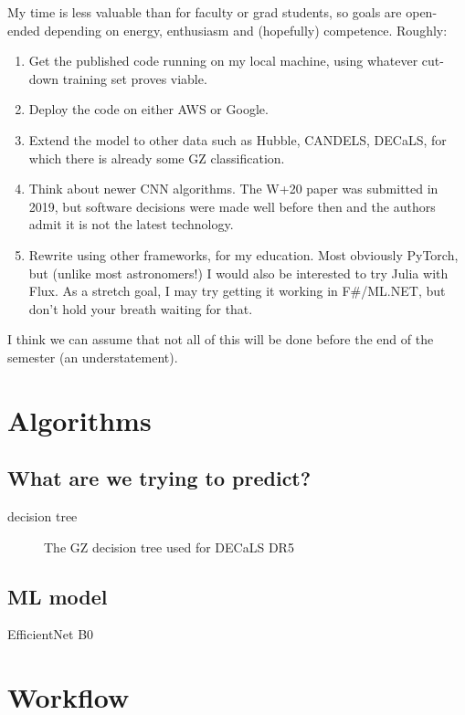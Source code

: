 \documentclass[twocolumn, twocolappendix, tighten]{aastex631}
\begin{document}
My time is less valuable than for faculty or grad students, so goals are open-ended depending on energy, enthusiasm and (hopefully) competence. Roughly:
\begin{enumerate}
	\item Get the published code running on my local machine, using whatever cut-down training set proves viable.
	\item Deploy the code on either AWS or Google.
	\item Extend the model to other data such as Hubble, CANDELS, DECaLS, for which there is already some GZ classification.
	\item Think about newer CNN algorithms. The W+20 paper was submitted in 2019, but software decisions were made well before then and the authors admit it is not the latest technology.
	\item Rewrite using other frameworks, for my education. Most obviously PyTorch, but (unlike most astronomers!) I would also be interested to try Julia with Flux. As a stretch goal, I may try getting it working in F\#/ML.NET, but don't hold your breath waiting for that.
\end{enumerate}

I think we can assume that not all of this will be done before the end of the semester (an understatement).

\section{Algorithms}

\subsection{What are we trying to predict?}

decision tree

\begin{figure}[htb!]
	\caption{The GZ decision tree used for DECaLS DR5
		\label{fig:decals_decisions}}
\end{figure}


\subsection{ML model}

EfficientNet B0

\section{Workflow}
\end{document}
